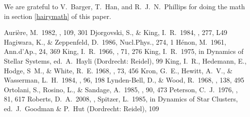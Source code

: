 \documentclass[11pt,twoside]{article}  %
\begin{document}
\acknowledgments

We are grateful to V.\ Barger, T.\ Han, and R.~J.~N.\ Phillips for doing
the math in section \ref{hairymath} of this paper.

%
%
%

\begin{references}

 Auri\`ere, M.\  1982, \aap, 109, 301
 Djorgovski, S., \& King, I.\ R.\  1984, \apj, 277, L49
 Hagiwara, K., \& Zeppenfeld, D.\  1986, Nucl.Phys., 274, 1
 H\'enon, M.\  1961, Ann.d'Ap., 24, 369
 King, I.~R.\  1966, \aj, 71, 276
 King, I.~R.\  1975, in Dynamics of Stellar Systems, ed.\ A.\ Hayli
    (Dordrecht: Reidel), 99
 King, I.\ R., Hedemann, E., Hodge, S\ M., \& White, R.~E.
    1968, \aj, 73, 456
 Kron, G.~E., Hewitt, A.~V., \& Wasserman, L.~H.\
    1984, \pasp, 96, 198
 Lynden-Bell, D., \& Wood, R.\  1968, \mnras, 138, 495
 Ortolani, S., Rosino, L., \& Sandage, A.\  1985, \aj, 90, 473
 Peterson, C.~J.\  1976, \aj, 81, 617
 Roberts, D.~A.\ 2008, \adassxvii, 
\reference Spitzer, L.\  1985, in Dynamics of Star Clusters,
    ed.~J.~Goodman \& P.~Hut (Dordrecht: Reidel), 109
    
\end{references}

\end{document}
